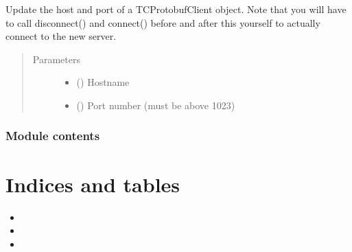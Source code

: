 \documentclass[letterpaper,10pt,english]{sphinxmanual}
\begin{document}
\begin{fulllineitems}

\begin{fulllineitems}
\label{\detokenize{tcpb:tcpb.tcpb.TCProtobufClient.update_address}}
Update the host and port of a TCProtobufClient object.
Note that you will have to call disconnect() and connect() before and after this
yourself to actually connect to the new server.
\begin{quote}\begin{description}
\item[{Parameters}] \leavevmode\begin{itemize}
\item {} 
 () \textendash{} Hostname

\item {} 
 () \textendash{} Port number (must be above 1023)

\end{itemize}

\end{description}\end{quote}

\end{fulllineitems}


\end{fulllineitems}



\subsection{Module contents}
\label{\detokenize{tcpb:module-tcpb}}\label{\detokenize{tcpb:module-contents}}

\chapter{Indices and tables}
\label{\detokenize{index:indices-and-tables}}\begin{itemize}
\item {} 

\item {} 

\item {} 

\end{itemize}
\end{document}
